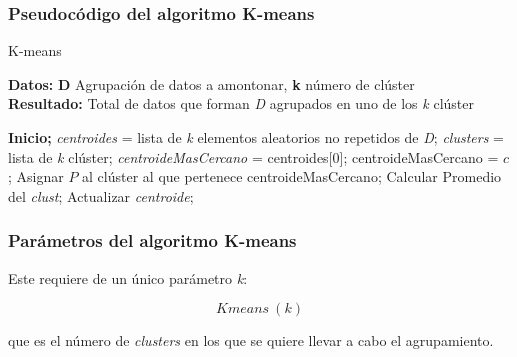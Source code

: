 \vspace{-3mm}

\subsubsection*{Pseudocódigo del algoritmo K-means}

\vspace{-2mm}

\begin{myalgorithm}[H]
\footnotesize
\caption{K-means}
\textbf{Datos:} \textbf{D} Agrupación de datos a amontonar, \textbf{k} número de clúster\\
\textbf{Resultado:} Total de datos que forman \textit{D} agrupados en uno de los \textit{k} clúster
\begin{algorithmic}[1]
\State \textbf{Inicio;}
\State \textit{centroides} = lista de \textit{k} elementos aleatorios no repetidos de \textit{D};
\State \textit{clusters} = lista de \textit{k} clúster;
\Repeat
        \State \textit{centroideMasCercano} = centroides[0];
                \State centroideMasCercano = $c$;
            \EndIf
        \EndFor
        \State Asignar $P$ al clúster al que pertenece centroideMasCercano;
    \EndFor
        \State Calcular Promedio del \textit{clust};
        \State Actualizar \textit{centroide};
    \EndFor
{}
\end{algorithmic}
\end{myalgorithm}

\vspace{-0.3cm}

\subsubsection*{Parámetros del algoritmo K-means}

Este requiere de un único parámetro \textit{k}:

\begin{equation}
    Kmeans\ ( k )
\end{equation}

que es el número de \textit{clusters} en los que se quiere llevar a cabo el agrupamiento. \\

